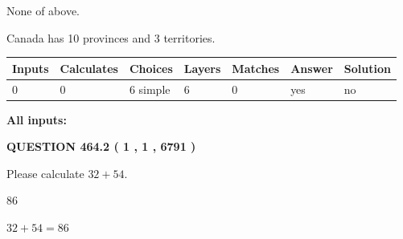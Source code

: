 \documentclass[12pt]{article}
\begin{document}
 
 None of above.
 
 
\noindent{}
 
 
Canada has 10  provinces and 3 territories.
 
 
\noindent{}
 
 
   
   
   
   
\noindent\begin{tabular}{|l|l|l|l|l|l|l|}
 \hline
Inputs & Calculates & Choices & Layers & Matches & Answer & Solution \\ \hline
 0  & 
 0  & 
 6
  simple  
  & 
 6  & 
 0  & 
  yes & 
  no 
  \\ \hline
 \end{tabular}
   
   
   
   
\noindent{}
   
   
   
   
\noindent\vspace{0.1in}\hspace{-0.08in} {\textbf{\Large{All inputs: }}}
   
   
  
\vspace{0.2in}
  
{\textbf{\Large{QUESTION
464.2 
 ( 1 , 1 , 6791 )
}}}
  
  
 
Please calculate $ %
32 +  %
54 $.
 
 
 
\noindent{}
 
 

86
 
 
\noindent{}
 
 

 
 
 
\noindent{}
 
 

$ %
32 +  %
54=   %
86$
 
\end{document}
